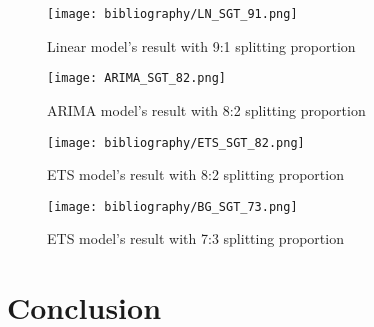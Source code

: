 \documentclass{ieeeojies}
\begin{document}
\begin{figure}[H]
  \centering
  \begin{minipage}{0.8\linewidth}
    \centering
    \texttt{[image: bibliography/LN\_SGT\_91.png]}
    \caption{Linear model's result with 9:1 splitting proportion}
    \label{fig22}
  \end{minipage}
\end{figure}
\begin{figure}[H]
  \centering
  \begin{minipage}{0.8\linewidth}
    \centering
    \texttt{[image: ARIMA\_SGT\_82.png]}
    \caption{ARIMA model's result with 8:2 splitting proportion}
    \label{fig23}
  \end{minipage}
\end{figure}
\begin{figure}[H]
  \centering
  \begin{minipage}{0.8\linewidth}
    \centering
    \texttt{[image: bibliography/ETS\_SGT\_82.png]}
    \caption{ETS model's result with 8:2 splitting proportion}
    \label{fig24}
  \end{minipage}
\end{figure}
\begin{figure}[H]
  \centering
  \begin{minipage}{0.8\linewidth}
    \centering
    \texttt{[image: bibliography/BG\_SGT\_73.png]}
    \caption{ETS model's result with 7:3 splitting proportion}
    \label{fig24}
  \end{minipage}
\end{figure}




\section{Conclusion}
\end{document}
